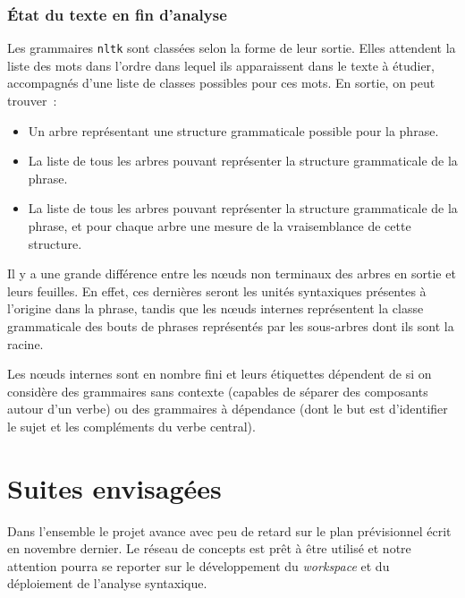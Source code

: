 \documentclass[a4paper, 12pt]{article}
\newcommand{\pyt}[1]{\texttt{#1}}%
\begin{document}
\subsubsection{\'Etat du texte en fin d'analyse}
Les grammaires \pyt{nltk} sont classées selon la forme de leur sortie. Elles attendent la liste des mots dans l'ordre dans lequel ils apparaissent dans le texte à étudier, accompagnés d'une liste de classes possibles pour ces mots. En sortie, on peut trouver~:

\begin{itemize}
	\item Un arbre représentant une structure grammaticale possible pour la phrase.
	\item La liste de tous les arbres pouvant représenter la structure grammaticale de la phrase.
	\item La liste de tous les arbres pouvant représenter la structure grammaticale de la phrase, et pour chaque arbre une mesure de la vraisemblance de cette structure.
\end{itemize}

Il y a une grande différence entre les n\oe{}uds non terminaux des arbres en sortie et leurs feuilles. En effet, ces dernières seront les unités syntaxiques présentes à l'origine dans la phrase, tandis que les n\oe{}uds internes représentent la classe grammaticale des bouts de phrases représentés par les sous-arbres dont ils sont la racine.


Les n\oe{}uds internes sont en nombre fini et leurs étiquettes dépendent de si on considère des grammaires sans contexte (capables de séparer des composants autour d'un verbe) ou des grammaires à dépendance (dont le but est d'identifier le sujet et les compléments du verbe central).


\section{Suites envisagées}

Dans l'ensemble le projet avance avec peu de retard sur le plan prévisionnel écrit en novembre dernier. Le réseau de concepts est prêt à être utilisé et notre attention pourra se reporter sur le développement du \textit{workspace} et du déploiement de l'analyse syntaxique.
\end{document}
